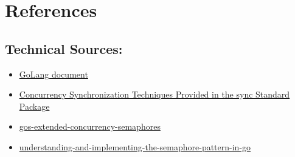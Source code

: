 \documentclass[letterpaper,12pt]{article}
\theoremstyle{remark}
\begin{document}
\section*{References}


\subsection*{Technical Sources:}

\begin{itemize}

    \item \href{https://go.dev/doc/}{GoLang document}
    \item \href{https://go101.org/article/concurrent-synchronization-more.html}{Concurrency Synchronization Techniques Provided in the sync Standard Package}
    \item \href{https://medium.com/@deckarep/gos-extended-concurrency-semaphores-part-1-5eeabfa351ce}{gos-extended-concurrency-semaphores}
    \item \href{https://www.codingexplorations.com/blog/understanding-and-implementing-the-semaphore-pattern-in-go}{understanding-and-implementing-the-semaphore-pattern-in-go}
         \end{itemize}
\end{document}
